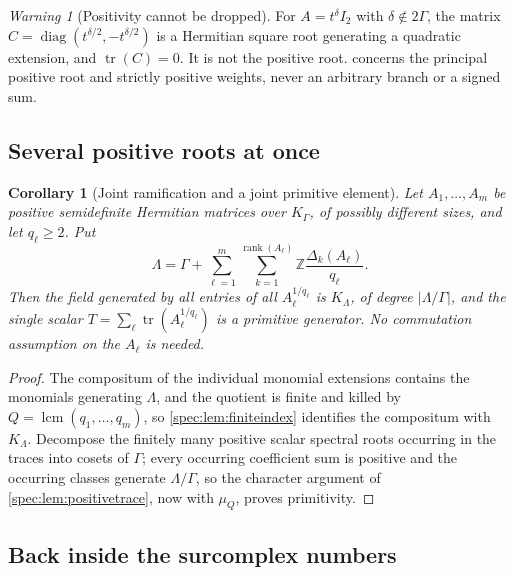\documentclass[11pt,a4paper]{article}
\numberwithin{equation}{section}
\newtheorem{corollary}[corollary]{Corollary}
\theoremstyle{definition}
\theoremstyle{remark}
\newtheorem{warning}[warning]{Warning}
\newcommand{\Z}{\mathbb Z}
\newcommand{\rank}{\operatorname{rank}}
\newcommand{\tr}{\operatorname{tr}}
\newcommand{\diag}{\operatorname{diag}}
\newcommand{\lcm}{\operatorname{lcm}}
\begin{document}
\begin{warning}[Positivity cannot be dropped]\label{spec:warn:positivity}
For $A=t^\delta I_2$ with $\delta\notin2\Gamma$, the matrix
$C=\diag(t^{\delta/2},-t^{\delta/2})$ is a Hermitian square root generating
a quadratic extension, and $\tr(C)=0$. It is not the positive root.
 concerns the principal positive root and
strictly positive weights, never an arbitrary branch or a signed sum.
\end{warning}

\subsection{Several positive roots at once}

\begin{corollary}[Joint ramification and a joint primitive element]\label{spec:cor:joint}
Let $A_1,\ldots,A_m$ be positive semidefinite Hermitian matrices over
$K_\Gamma$, of possibly different sizes, and let $q_\ell\ge2$. Put
\[
 \Lambda=\Gamma+\sum_{\ell=1}^m\sum_{k=1}^{\rank(A_\ell)}
   \Z\frac{\Delta_k(A_\ell)}{q_\ell}.
\]
Then the field generated by all entries of all $A_\ell^{1/q_\ell}$ is
$K_\Lambda$, of degree $|\Lambda/\Gamma|$, and the single scalar
$T=\sum_\ell\tr(A_\ell^{1/q_\ell})$ is a primitive generator. No commutation
assumption on the $A_\ell$ is needed.
\end{corollary}
\begin{proof}
The compositum of the individual monomial extensions contains the monomials
generating $\Lambda$, and the quotient is finite and killed by
$Q=\lcm(q_1,\ldots,q_m)$, so \cref{spec:lem:finiteindex} identifies the
compositum with $K_\Lambda$. Decompose the finitely many positive scalar
spectral roots occurring in the traces into cosets of $\Gamma$; every
occurring coefficient sum is positive and the occurring classes generate
$\Lambda/\Gamma$, so the character argument of
\cref{spec:lem:positivetrace}, now with $\mu_Q$, proves primitivity.
\end{proof}

\subsection{Back inside the surcomplex numbers}
\end{document}
